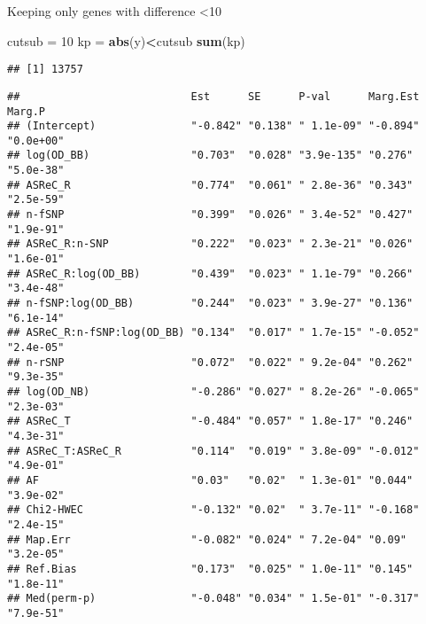 \documentclass[]{article}
\newenvironment{Shaded}{\begin{snugshade}}{\end{snugshade}}
\newcommand{\KeywordTok}[1]{\textcolor[rgb]{0.13,0.29,0.53}{\textbf{#1}}}
\newcommand{\DecValTok}[1]{\textcolor[rgb]{0.00,0.00,0.81}{#1}}
\newcommand{\StringTok}[1]{\textcolor[rgb]{0.31,0.60,0.02}{#1}}
\newcommand{\OperatorTok}[1]{\textcolor[rgb]{0.81,0.36,0.00}{\textbf{#1}}}
\newcommand{\NormalTok}[1]{#1}
\begin{document}
Keeping only genes with difference \textless{}10

\begin{Shaded}
\begin{Highlighting}[]
\NormalTok{cutsub =}\StringTok{ }\DecValTok{10}
\NormalTok{kp =}\StringTok{ }\KeywordTok{abs}\NormalTok{(y)}\OperatorTok{<}\NormalTok{cutsub}
\KeywordTok{sum}\NormalTok{(kp)}
\end{Highlighting}
\end{Shaded}

\begin{verbatim}
## [1] 13757
\end{verbatim}

\begin{Shaded}
\end{Shaded}

\begin{verbatim}
##                           Est      SE      P-val      Marg.Est Marg.P   
## (Intercept)               "-0.842" "0.138" " 1.1e-09" "-0.894" "0.0e+00"
## log(OD_BB)                "0.703"  "0.028" "3.9e-135" "0.276"  "5.0e-38"
## ASReC_R                   "0.774"  "0.061" " 2.8e-36" "0.343"  "2.5e-59"
## n-fSNP                    "0.399"  "0.026" " 3.4e-52" "0.427"  "1.9e-91"
## ASReC_R:n-SNP             "0.222"  "0.023" " 2.3e-21" "0.026"  "1.6e-01"
## ASReC_R:log(OD_BB)        "0.439"  "0.023" " 1.1e-79" "0.266"  "3.4e-48"
## n-fSNP:log(OD_BB)         "0.244"  "0.023" " 3.9e-27" "0.136"  "6.1e-14"
## ASReC_R:n-fSNP:log(OD_BB) "0.134"  "0.017" " 1.7e-15" "-0.052" "2.4e-05"
## n-rSNP                    "0.072"  "0.022" " 9.2e-04" "0.262"  "9.3e-35"
## log(OD_NB)                "-0.286" "0.027" " 8.2e-26" "-0.065" "2.3e-03"
## ASReC_T                   "-0.484" "0.057" " 1.8e-17" "0.246"  "4.3e-31"
## ASReC_T:ASReC_R           "0.114"  "0.019" " 3.8e-09" "-0.012" "4.9e-01"
## AF                        "0.03"   "0.02"  " 1.3e-01" "0.044"  "3.9e-02"
## Chi2-HWEC                 "-0.132" "0.02"  " 3.7e-11" "-0.168" "2.4e-15"
## Map.Err                   "-0.082" "0.024" " 7.2e-04" "0.09"   "3.2e-05"
## Ref.Bias                  "0.173"  "0.025" " 1.0e-11" "0.145"  "1.8e-11"
## Med(perm-p)               "-0.048" "0.034" " 1.5e-01" "-0.317" "7.9e-51"
\end{verbatim}
\end{document}

